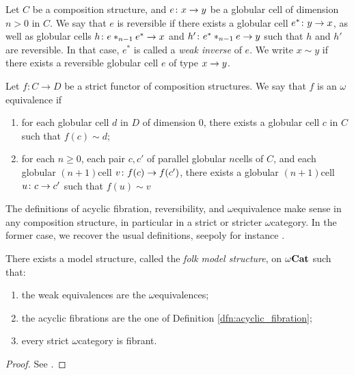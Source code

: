 \begin{dfn} 
    Let \( C \) be a composition structure, and \( e \colon x \to y \) be a globular cell of dimension \( n > 0 \) in \( C \).
    We say that \( e \) is reversible if there exists a globular cell \( e^* \colon y \to x \), as well as globular cells \( h \colon e *_{n - 1} e^* \to x \) and \( h' \colon e^* *_{n - 1} e \to y \) such that \( h \) and \( h' \) are reversible.
    In that case, \( e^* \) is called a \emph{weak inverse} of \( e \).
    We write \( x \sim y \) if there exists a reversible globular cell \( e \) of type \( x \to y \).
\end{dfn}

\begin{dfn} 
    Let \( f \colon C \to D \) be a strict functor of composition structures.
    We say that \( f \) is an \( \omega \)\nbd equivalence if
    \begin{enumerate}
        \item for each globular cell \( d \) in \( D \) of dimension \( 0 \), there exists a globular cell \( c \) in \( C \) such that \( f(c) \sim d \);
        \item for each \( n \geq 0 \), each pair \( c, c' \) of parallel globular \( n \)\nbd cells of \( C \), and each globular \( (n + 1) \)\nbd cell \( v \colon f(c) \to f(c') \), there exists a globular \( (n + 1) \)\nbd cell \( u \colon c \to c' \) such that \( f(u) \sim v \)
    \end{enumerate}
\end{dfn}

\begin{comm}
    The definitions of acyclic fibration, reversibility, and \( \omega \)\nbd equivalence make sense in any composition structure, in particular in a strict or stricter \( \omega \)\nbd category.
    In the former case, we recover the usual definitions, seepoly for instance \cite[19.2.3, 20.1.1, 20.1.11]{ara2025polygraphs}.
\end{comm}

\begin{thm} \label{thm:folk_model_structure}
    There exists a model structure, called the \emph{folk model structure}, on \( {\omega\mathbf{Cat}} \) such that:
    \begin{enumerate}
        \item the weak equivalences are the \( \omega \)\nbd equivalences;
        \item the acyclic fibrations are the one of Definition \ref{dfn:acyclic_fibration};
        \item every strict \( \omega \)\nbd category is fibrant. 
    \end{enumerate} 
\end{thm}
\begin{proof} 
    See \cite{lafont2010folk}.
\end{proof}

